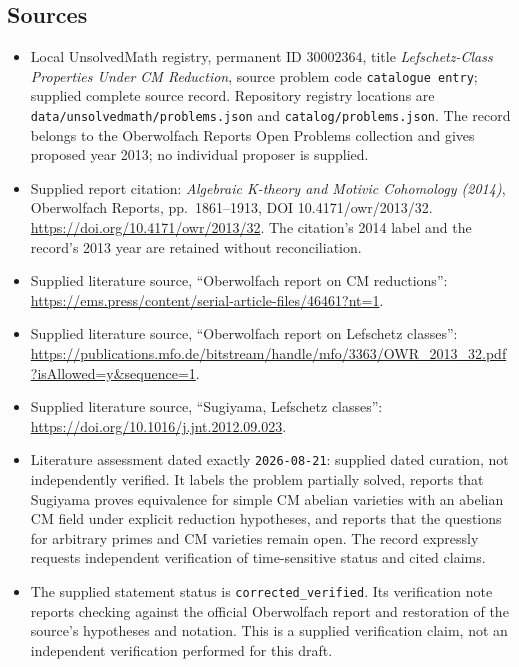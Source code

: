 \documentclass[11pt]{article}
\begin{document}
\subsection{Sources}
\begin{itemize}
\item Local UnsolvedMath registry, permanent ID \(30002364\), title \emph{Lefschetz-Class Properties Under CM Reduction}, source problem code \texttt{catalogue entry}; supplied complete source record. Repository registry locations are \texttt{data/unsolvedmath/problems.json} and \texttt{catalog/problems.json}. The record belongs to the Oberwolfach Reports Open Problems collection and gives proposed year 2013; no individual proposer is supplied.
\item Supplied report citation: \emph{Algebraic K-theory and Motivic Cohomology (2014)}, Oberwolfach Reports, pp.\ 1861--1913, DOI 10.4171/owr/2013/32. \url{https://doi.org/10.4171/owr/2013/32}. The citation's 2014 label and the record's 2013 year are retained without reconciliation.
\item Supplied literature source, ``Oberwolfach report on CM reductions'': \url{https://ems.press/content/serial-article-files/46461?nt=1}.
\item Supplied literature source, ``Oberwolfach report on Lefschetz classes'': \url{https://publications.mfo.de/bitstream/handle/mfo/3363/OWR_2013_32.pdf?isAllowed=y&sequence=1}.
\item Supplied literature source, ``Sugiyama, Lefschetz classes'': \url{https://doi.org/10.1016/j.jnt.2012.09.023}.
\item Literature assessment dated exactly \texttt{2026-08-21}: supplied dated curation, not independently verified. It labels the problem partially solved, reports that Sugiyama proves equivalence for simple CM abelian varieties with an abelian CM field under explicit reduction hypotheses, and reports that the questions for arbitrary primes and CM varieties remain open. The record expressly requests independent verification of time-sensitive status and cited claims.
\item The supplied statement status is \texttt{corrected\_verified}. Its verification note reports checking against the official Oberwolfach report and restoration of the source's hypotheses and notation. This is a supplied verification claim, not an independent verification performed for this draft.
\end{itemize}
\end{document}
